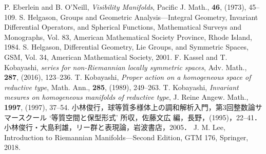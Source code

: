  P. Eberlein and B. O'Neill, \textit{Visibility Manifolds}, Pacific J. Math., \textbf{46}, (1973), 45--109.
 S. Helgason, Groups and Geometric Analysis---Integral Geometry, Invariant Differential Operators, and Spherical Functions, Mathematical Surveys and Monographs, Vol. 83, American Mathematical Society Province, Rhode Island, 1984.
 S. Helgason, Differential Geometry, Lie Groups, and Symmetric Spaces, GSM, Vol. 34, American Mathematical Society, 2001.
 F. Kassel and T. Kobayashi, \textit{{\Poincare} series for non-Riemannian locally symmetric spaces}, Adv. Math., \textbf{287}, (2016), 123--236.
 T. Kobayashi, 
  \textit{Proper action on a homogeneous space of reductive type},
  Math. Ann., \textbf{285}, (1989), 249--263.  
 T. Kobayashi, \textit{Invariant mesures on homogeneous manifolds of reductive type}, J. Reine Angew. Math., \textbf{1997}, (1997), 37--54.
 小林俊行，球等質多様体上の調和解析入門，第3回整数論サマースクール `等質空間と保型形式' 所収，佐藤文広 編，長野，(1995)，22--41．
 小林俊行・大島利雄，リー群と表現論，岩波書店，2005．
 J. M. Lee, Introduction to Riemannian Manifolds---Second Edition, GTM 176, Springer, 2018.
